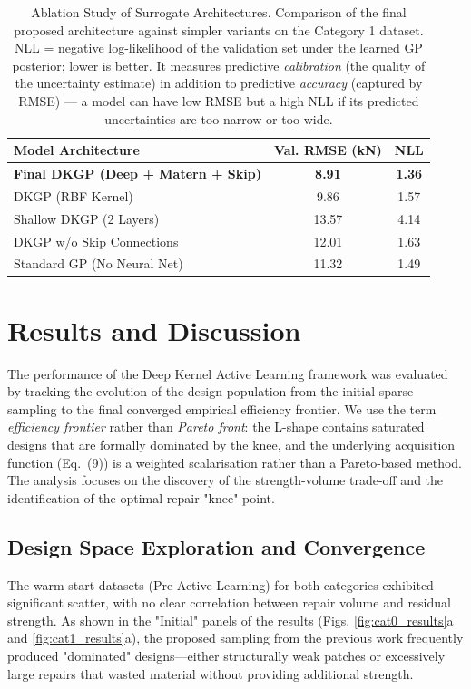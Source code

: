 \documentclass[
  preprint,
  12pt,
  a4paper
]{elsarticle}
\newcommand{\new}[1]{#1}
\begin{document}
\begin{table}[htbp]
    \centering
    \caption{Ablation Study of Surrogate Architectures. Comparison of the final proposed architecture against simpler variants on the Category 1 dataset. \new{NLL = negative log-likelihood of the validation set under the learned GP posterior; lower is better. It measures predictive \emph{calibration} (the quality of the uncertainty estimate) in addition to predictive \emph{accuracy} (captured by RMSE) --- a model can have low RMSE but a high NLL if its predicted uncertainties are too narrow or too wide.}}
    \label{tab:ablation}
    \begin{tabular}{l c c}
        \toprule
        \textbf{Model Architecture} & \textbf{Val. RMSE (kN)} & \textbf{NLL} \\
        \midrule
        \textbf{Final DKGP (Deep + Matern + Skip)} & \textbf{8.91} & \textbf{1.36} \\
        DKGP (RBF Kernel) & 9.86 & 1.57 \\
        Shallow DKGP (2 Layers) & 13.57 & 4.14 \\
        DKGP w/o Skip Connections & 12.01 & 1.63 \\
        Standard GP (No Neural Net) & 11.32 & 1.49 \\
        \bottomrule
    \end{tabular}
\end{table}

\section{Results and Discussion}
\label{sec:results}

The performance of the Deep Kernel Active Learning framework was evaluated by tracking the evolution of the design population from the initial sparse sampling to the final converged \new{empirical efficiency frontier}. \new{We use the term \emph{efficiency frontier} rather than \emph{Pareto front}: the L-shape contains saturated designs that are formally dominated by the knee, and the underlying acquisition function (Eq.~(9)) is a weighted scalarisation rather than a Pareto-based method.} The analysis focuses on the discovery of the strength-volume trade-off and the identification of the optimal repair "knee" point.

\subsection{Design Space Exploration and Convergence}
The \new{warm-start datasets} (Pre-Active Learning) for both categories exhibited significant scatter, with no clear correlation between repair volume and residual strength. As shown in the "Initial" panels of the results (Figs. \ref{fig:cat0_results}a and \ref{fig:cat1_results}a), the proposed sampling from the previous work frequently produced "dominated" designs—either structurally weak patches or excessively large repairs that wasted material without providing additional strength.
\end{document}
